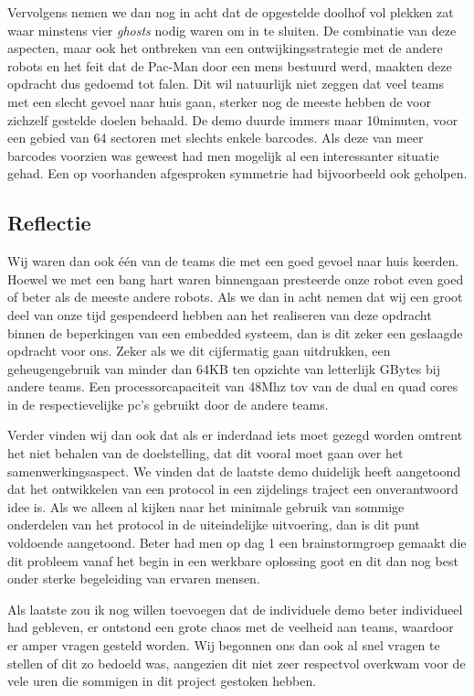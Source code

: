 \documentclass[12pt,a4paper]{report}
\begin{document}
Vervolgens nemen we dan nog in acht dat de opgestelde doolhof vol plekken zat waar minstens vier \emph{ghosts} nodig waren om in te sluiten. De combinatie van deze aspecten, maar ook het ontbreken van een ontwijkingsstrategie met de andere robots en het feit dat de Pac-Man door een mens bestuurd werd, maakten deze opdracht dus gedoemd tot falen. Dit wil natuurlijk niet zeggen dat veel teams met een slecht gevoel naar huis gaan, sterker nog de meeste hebben de voor zichzelf gestelde doelen behaald.  De demo duurde immers maar 10minuten, voor een gebied van 64 sectoren met slechts enkele barcodes. Als deze van meer barcodes voorzien was geweest had men mogelijk al een interessanter situatie gehad. Een op voorhanden afgesproken symmetrie had bijvoorbeeld ook geholpen.

\subsection{Reflectie}

Wij waren dan ook \'e\'en van de teams die met een goed gevoel naar huis keerden. Hoewel we met een bang hart waren binnengaan presteerde onze robot even goed of beter als de meeste andere robots. Als we dan in acht nemen dat wij een groot deel van onze tijd gespendeerd hebben aan het realiseren van deze opdracht binnen de beperkingen van een embedded systeem, dan is dit zeker een geslaagde opdracht voor ons. Zeker als we dit cijfermatig gaan uitdrukken, een geheugengebruik van minder dan 64KB ten opzichte van letterlijk GBytes bij andere teams. Een processorcapaciteit van 48Mhz tov van de dual en quad cores in de respectievelijke pc's gebruikt door de andere teams.

Verder vinden wij dan ook dat als er inderdaad iets moet gezegd worden omtrent het niet behalen van de doelstelling, dat dit vooral moet gaan over het samenwerkingsaspect. We vinden dat de laatste demo duidelijk heeft aangetoond dat het ontwikkelen van een protocol in een zijdelings traject een onverantwoord idee is. Als we alleen al kijken naar het minimale gebruik van sommige onderdelen van het protocol in de uiteindelijke uitvoering, dan is dit punt voldoende aangetoond. Beter had men op dag 1 een brainstormgroep gemaakt die dit probleem vanaf het begin in een werkbare oplossing goot en dit dan nog best onder sterke begeleiding van ervaren mensen.

Als laatste zou ik nog willen toevoegen dat de individuele demo beter individueel had gebleven, er ontstond een grote chaos met de veelheid aan teams, waardoor er amper vragen gesteld worden. Wij begonnen ons dan ook al snel vragen te stellen of dit zo bedoeld was, aangezien dit niet zeer respectvol overkwam voor de vele uren die sommigen in dit project gestoken hebben.
\end{document}
